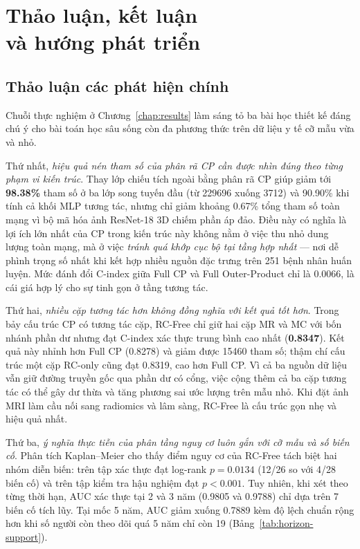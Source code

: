 \chapter[Thảo luận, kết luận và hướng phát triển]{Thảo luận, kết luận\\và hướng phát triển}
\label{chap:discussion}

\section{Thảo luận các phát hiện chính}
Chuỗi thực nghiệm ở Chương~\ref{chap:results} làm sáng tỏ ba bài học thiết kế đáng chú ý cho bài toán học sâu sống còn đa phương thức trên dữ liệu y tế cỡ mẫu vừa và nhỏ.

Thứ nhất, \emph{hiệu quả nén tham số của phân rã CP cần được nhìn đúng theo từng phạm vi kiến trúc}. Thay lớp chiếu tích ngoài bằng phân rã CP giúp giảm tới \textbf{98.38\%} tham số ở ba lớp song tuyến đầu (từ 229696 xuống 3712) và 90.90\% khi tính cả khối MLP tương tác, nhưng chỉ giảm khoảng 0.67\% tổng tham số toàn mạng vì bộ mã hóa ảnh ResNet-18 3D chiếm phần áp đảo. Điều này có nghĩa là lợi ích lớn nhất của CP trong kiến trúc này không nằm ở việc thu nhỏ dung lượng toàn mạng, mà ở việc \emph{tránh quá khớp cục bộ tại tầng hợp nhất} — nơi dễ phình trọng số nhất khi kết hợp nhiều nguồn đặc trưng trên 251 bệnh nhân huấn luyện. Mức đánh đổi C-index giữa Full CP và Full Outer-Product chỉ là 0.0066, là cái giá hợp lý cho sự tinh gọn ở tầng tương tác.

Thứ hai, \emph{nhiều cặp tương tác hơn không đồng nghĩa với kết quả tốt hơn}. Trong bảy cấu trúc CP có tương tác cặp, RC-Free chỉ giữ hai cặp MR và MC với bốn nhánh phần dư nhưng đạt C-index xác thực trung bình cao nhất (\textbf{0.8347}). Kết quả này nhỉnh hơn Full CP (0.8278) và giảm được 15460 tham số; thậm chí cấu trúc một cặp RC-only cũng đạt 0.8319, cao hơn Full CP. Vì cả ba nguồn dữ liệu vẫn giữ đường truyền gốc qua phần dư có cổng, việc cộng thêm cả ba cặp tương tác có thể gây dư thừa và tăng phương sai ước lượng trên mẫu nhỏ. Khi đặt ảnh MRI làm cầu nối sang radiomics và lâm sàng, RC-Free là cấu trúc gọn nhẹ và hiệu quả nhất.

Thứ ba, \emph{ý nghĩa thực tiễn của phân tầng nguy cơ luôn gắn với cỡ mẫu và số biến cố}. Phân tích Kaplan--Meier cho thấy điểm nguy cơ của RC-Free tách biệt hai nhóm diễn biến: trên tập xác thực đạt log-rank $p=0.0134$ (12/26 so với 4/28 biến cố) và trên tập kiểm tra hậu nghiệm đạt $p<0.001$. Tuy nhiên, khi xét theo từng thời hạn, AUC xác thực tại 2 và 3 năm (0.9805 và 0.9788) chỉ dựa trên 7 biến cố tích lũy. Tại mốc 5 năm, AUC giảm xuống 0.7889 kèm độ lệch chuẩn rộng hơn khi số người còn theo dõi quá 5 năm chỉ còn 19 (Bảng~\ref{tab:horizon-support}).

